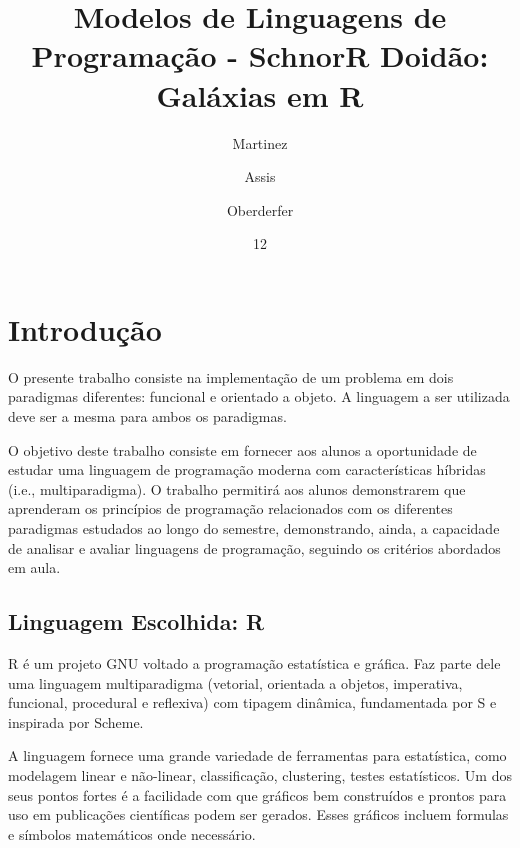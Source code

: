 \documentclass[rel_mlp]{iiufrgs}
\title{Modelos de Linguagens de Programação - SchnorR Doidão: Galáxias em R}
\author{Martinez}{José Pedro}
\author{Assis}{Lucas}
\author{Oberderfer}{Réges}
\date{12}{2017}
\begin{document}
\maketitle


\tableofcontents








%
\chapter{Introdução}

O presente trabalho consiste na implementação de um problema em dois paradigmas diferentes: funcional e orientado a objeto. A linguagem a ser utilizada deve ser a mesma para ambos os paradigmas.

O objetivo deste trabalho consiste em fornecer aos alunos a oportunidade de estudar uma linguagem de programação moderna com características híbridas (i.e., multiparadigma). O trabalho permitirá aos alunos demonstrarem que aprenderam os princípios de programação relacionados com os diferentes paradigmas estudados ao longo do semestre, demonstrando, ainda, a capacidade de analisar e avaliar linguagens de programação, seguindo os critérios abordados em aula.

\section{Linguagem Escolhida: R}
	R é um projeto GNU voltado a programação estatística e gráfica. Faz parte dele uma linguagem multiparadigma (vetorial, orientada a objetos, imperativa, funcional, procedural e reflexiva) com tipagem dinâmica, fundamentada por S e inspirada por Scheme.

	A linguagem fornece uma grande variedade de ferramentas para estatística, como modelagem linear e não-linear, classificação, clustering, testes estatísticos. Um dos seus pontos fortes é a facilidade com que gráficos bem construídos e prontos para uso em publicações científicas podem ser gerados. Esses gráficos incluem formulas e símbolos matemáticos onde necessário.
\end{document}
